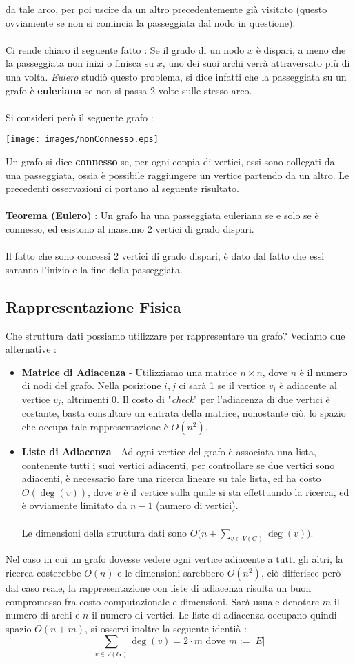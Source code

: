 \documentclass[12pt, letterpaper]{article}
\newcommand{\acc}{\\\hphantom{}\\}
\begin{document}
da tale arco, per poi uscire da un altro precedentemente già visitato (questo ovviamente se non si comincia la 
passeggiata dal nodo in questione).\acc 
Ci rende chiaro il seguente fatto : Se il grado di un nodo $x$ è dispari, a meno che la passeggiata non inizi 
o finisca su $x$, uno dei suoi archi verrà attraversato più di una volta. \textit{Eulero} studiò questo problema, 
si dice infatti che la passeggiata su un grafo è \textbf{euleriana} se non si passa 2 volte sulle stesso arco.\acc 
Si consideri però il seguente grafo :\begin{center}
    \texttt{[image: images/nonConnesso.eps]}
\end{center}
Un grafo si dice \textbf{connesso} se, per ogni coppia di vertici, essi sono collegati da una passeggiata, 
ossia è possibile raggiungere un vertice partendo da un altro. Le precedenti osservazioni ci portano al 
seguente risultato.\acc 
\textbf{Teorema (Eulero)} : Un grafo ha una passeggiata euleriana se e solo se è connesso, ed 
esistono al massimo 2 vertici di grado dispari.\acc 
Il fatto che sono concessi 2 vertici di grado dispari, è dato dal fatto che essi saranno l'inizio e la fine 
della passeggiata.
\subsection{Rappresentazione Fisica}
Che struttura dati possiamo utilizzare per rappresentare un grafo? Vediamo due alternative : \begin{itemize}
    \item \textbf{Matrice di Adiacenza} - Utilizziamo una matrice $n\times n$, dove \(n\) è il numero di 
    nodi del grafo. Nella posizione \(i,j\) ci sarà 1 se il vertice \(v_i\) è adiacente al vertice 
    \(v_j\), altrimenti 0. Il costo di "\textit{check}" per l'adiacenza di due vertici è costante, basta 
    consultare un entrata della matrice, nonostante ciò, lo spazio che occupa tale rappresentazione è 
    \(O(n^2)\).
    \item \textbf{Liste di Adiacenza} - Ad ogni vertice del grafo è associata una lista, contenente tutti 
    i suoi vertici adiacenti, per controllare se due vertici sono adiacenti, è necessario fare una ricerca 
    lineare su tale lista, ed ha costo $\displaystyle O(\deg(v))$, dove \(v\) è il vertice sulla 
    quale si sta effettuando la ricerca, ed è ovviamente limitato da \(n-1\) (numero di vertici).\acc
    Le dimensioni della struttura dati sono $\displaystyle O\big(n + \sum_{v\in V(G)}\deg(v)\big)$.
\end{itemize}
Nel caso in cui un grafo dovesse vedere ogni vertice adiacente a tutti gli altri, la ricerca costerebbe 
\(O(n)\) e le dimensioni sarebbero \(O(n^2)\), ciò differisce però dal caso reale, la rappresentazione con 
liste di adiacenza risulta un buon compromesso fra costo computazionale e dimensioni.
Sarà usuale denotare \(m\) il numero di archi e \(n\) il numero di vertici.
Le liste di adiacenza occupano quindi spazio $O(n+m)$,  si osservi inoltre la 
seguente identià : $$\sum_{v\in V(G)}\deg(v)=2\cdot m\text{ dove }m:=|E|$$
\end{document}
